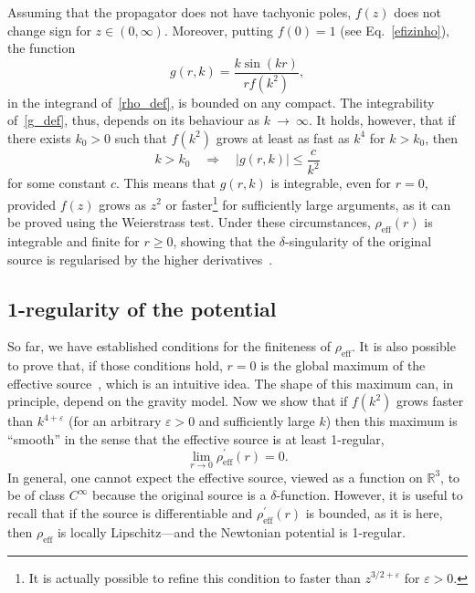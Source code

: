 \documentclass[aps,prd,a4paper,twocolumn,showpacs,showkeys,preprintnumbers,amsmath,amssymb,nofootinbib]{revtex4-2}
\numberwithin{equation}{section}
\def\de{\delta}
\begin{document}
Assuming that the propagator does not have tachyonic poles,  $f(z)$ does not change sign for $z \in (0,\infty)$. Moreover, putting $f(0) = 1$ (see Eq.~\eqref{efizinho}), the function
\begin{equation} \label{g_def}
g(r,k) = \frac{k \sin(kr)}{r f(k^2)},
\end{equation}
in the integrand of~\eqref{rho_def}, is bounded on any compact. The integrability of~\eqref{g_def}, thus, depends on its behaviour as $k~\to~\infty$. It holds, however, that if there exists $k_0>0$ such that $f(k^2)$ grows at least as fast as $k^{4}$ for $k>k_0$, then
\begin{equation}
k> k_0 \quad \Longrightarrow \quad \vert g(r,k) \vert  \leqslant \frac{c}{k^2}
\end{equation}
for some constant $c$.
This means that $g(r,k)$ is integrable, even for $r=0$, provided $f(z)$ grows as $z^{2}$ or faster\footnote{\label{PDP_acucar} It is actually possible to refine this condition to faster than $z^{3/2 + \varepsilon}$ for $\varepsilon > 0$.} 
for sufficiently large arguments, as it can be proved using the Weierstrass test.
Under these circumstances, $\rho_\text{eff}(r)$ is integrable and finite for $r \geqslant 0$, showing that the $\de$-singularity of the original source is regularised by the higher derivatives~\cite{BreTib2}.




\subsection{1-regularity of the potential}
\label{Sec5a}

So far, we have established conditions for the finiteness of $\rho_\text{eff}$. It is also possible to prove that, if those conditions hold, $r=0$ is the global maximum of the effective source~\cite{BreTib2}, which is an intuitive idea. The shape of this maximum can, in principle, depend on the gravity model. Now we show that if $f(k^2)$ grows faster than $k^{4+\varepsilon}$ (for an arbitrary $\varepsilon>0$ and sufficiently large $k$) then
this maximum is ``smooth'' in the sense that the effective source is at least 1-regular,
\begin{equation} \label{DerRho}
\lim_{r\rightarrow 0} \rho_\text{eff}^\prime(r) = 0.
\end{equation}
In general, one cannot expect the effective source, viewed as a function on $\mathbb{R}^3$, to be of class $C^\infty$ because the original source is a $\de$-function. However, it is useful to recall that if the source is differentiable and $\rho_\text{eff}^\prime(r)$ is bounded, as it is here, then $\rho_\text{eff}$ is locally Lipschitz---and the Newtonian potential is 1-regular.
\end{document}

